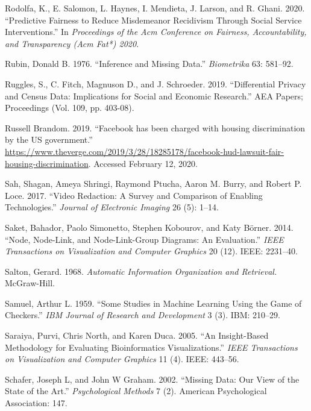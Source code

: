\documentclass[]{krantz}
\begin{document}
\hypertarget{ref-Rodolfa2020}{}
Rodolfa, K., E. Salomon, L. Haynes, I. Mendieta, J. Larson, and R.
Ghani. 2020. ``Predictive Fairness to Reduce Misdemeanor Recidivism
Through Social Service Interventions.'' In \emph{Proceedings of the Acm
Conference on Fairness, Accountability, and Transparency (Acm Fat*)
2020}.

\hypertarget{ref-rubin1976}{}
Rubin, Donald B. 1976. ``Inference and Missing Data.'' \emph{Biometrika}
63: 581--92.

\hypertarget{ref-ruggles2019}{}
Ruggles, S., C. Fitch, Magnuson D., and J. Schroeder. 2019.
``Differential Privacy and Census Data: Implications for Social and
Economic Research.'' AEA Papers; Proceedings (Vol. 109, pp. 403-08).

\hypertarget{ref-brandom2019}{}
Russell Brandom. 2019. ``Facebook has been charged with housing
discrimination by the US government.''
\url{https://www.theverge.com/2019/3/28/18285178/facebook-hud-lawsuit-fair-housing-discrimination}.
Accessed February 12, 2020.

\hypertarget{ref-Sah2017}{}
Sah, Shagan, Ameya Shringi, Raymond Ptucha, Aaron M. Burry, and Robert
P. Loce. 2017. ``Video Redaction: A Survey and Comparison of Enabling
Technologies.'' \emph{Journal of Electronic Imaging} 26 (5): 1--14.

\hypertarget{ref-saket2014node}{}
Saket, Bahador, Paolo Simonetto, Stephen Kobourov, and Katy Börner.
2014. ``Node, Node-Link, and Node-Link-Group Diagrams: An Evaluation.''
\emph{IEEE Transactions on Visualization and Computer Graphics} 20 (12).
IEEE: 2231--40.

\hypertarget{ref-salton-68}{}
Salton, Gerard. 1968. \emph{Automatic Information Organization and
Retrieval.} McGraw-Hill.

\hypertarget{ref-samuel1959some}{}
Samuel, Arthur L. 1959. ``Some Studies in Machine Learning Using the
Game of Checkers.'' \emph{IBM Journal of Research and Development} 3
(3). IBM: 210--29.

\hypertarget{ref-saraiya2005insight}{}
Saraiya, Purvi, Chris North, and Karen Duca. 2005. ``An Insight-Based
Methodology for Evaluating Bioinformatics Visualizations.'' \emph{IEEE
Transactions on Visualization and Computer Graphics} 11 (4). IEEE:
443--56.

\hypertarget{ref-schafer2002missing}{}
Schafer, Joseph L, and John W Graham. 2002. ``Missing Data: Our View of
the State of the Art.'' \emph{Psychological Methods} 7 (2). American
Psychological Association: 147.
\end{document}
